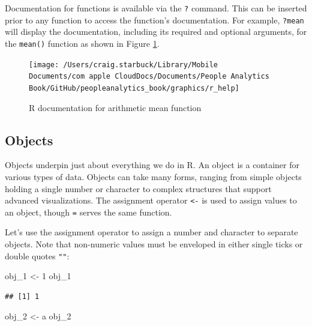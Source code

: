 \documentclass[
]{book}
\newenvironment{Shaded}{\begin{snugshade}}{\end{snugshade}}
\newcommand{\DecValTok}[1]{\textcolor[rgb]{0.00,0.00,0.81}{#1}}
\newcommand{\NormalTok}[1]{#1}
\newcommand{\OtherTok}[1]{\textcolor[rgb]{0.56,0.35,0.01}{#1}}
\newcommand{\StringTok}[1]{\textcolor[rgb]{0.31,0.60,0.02}{#1}}
\begin{document}
Documentation for functions is available via the \texttt{?} command. This can be inserted prior to any function to access the function's documentation. For example, \texttt{?mean} will display the documentation, including its required and optional arguments, for the \texttt{mean()} function as shown in Figure \ref{fig:r-help}.

\begin{figure}

{\centering \texttt{[image: /Users/craig.starbuck/Library/Mobile Documents/com~apple~CloudDocs/Documents/People Analytics Book/GitHub/peopleanalytics\_book/graphics/r\_help]} 

}

\caption{R documentation for arithmetic mean function}\label{fig:r-help}
\end{figure}

\hypertarget{objects}{%
\subsection{Objects}\label{objects}}

Objects underpin just about everything we do in R. An object is a container for various types of data. Objects can take many forms, ranging from simple objects holding a single number or character to complex structures that support advanced visualizations. The assignment operator \texttt{\textless{}-} is used to assign values to an object, though \texttt{=} serves the same function.

Let's use the assignment operator to assign a number and character to separate objects. Note that non-numeric values must be enveloped in either single ticks \texttt{\textquotesingle{}\textquotesingle{}} or double quotes \texttt{""}:

\begin{Shaded}
\begin{Highlighting}[]
\NormalTok{obj\_1 }\OtherTok{\textless{}{-}} \DecValTok{1}
\NormalTok{obj\_1}
\end{Highlighting}
\end{Shaded}

\begin{verbatim}
## [1] 1
\end{verbatim}

\begin{Shaded}
\begin{Highlighting}[]
\NormalTok{obj\_2 }\OtherTok{\textless{}{-}} \StringTok{\textquotesingle{}a\textquotesingle{}}
\NormalTok{obj\_2}
\end{Highlighting}
\end{Shaded}
\end{document}
